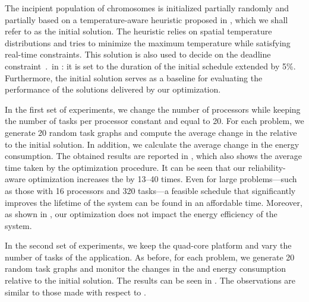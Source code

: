 The incipient population of chromosomes is initialized partially randomly and
partially based on a temperature-aware heuristic proposed in \cite{xie2006},
which we shall refer to as the initial solution. The heuristic relies on spatial
temperature distributions and tries to minimize the maximum temperature while
satisfying real-time constraints. This solution is also used to decide on the
deadline constraint $\period$ in : it is set
to the duration of the initial schedule extended by 5\%. Furthermore, the
initial solution serves as a baseline for evaluating the performance of the
solutions delivered by our optimization.

In the first set of experiments, we change the number of processors \np while
keeping the number of tasks \nt per processor constant and equal to 20. For each
problem, we generate 20 random task graphs and compute the average change in the
 relative to the initial solution. In addition, we calculate the
average change in the energy consumption. The obtained results are reported in
, which also shows the average time taken by
the optimization procedure. It can be seen that our reliability-aware
optimization increases the  by 13--40 times. Even for large
problems---such as those with 16 processors and 320 tasks---a feasible schedule
that significantly improves the lifetime of the system can be found in an
affordable time. Moreover, as shown in , our
optimization does not impact the energy efficiency of the system.

In the second set of experiments, we keep the quad-core platform and vary the
number of tasks \nt of the application. As before, for each problem, we generate
20 random task graphs and monitor the changes in the  and energy
consumption relative to the initial solution. The results can be seen in
. The observations are similar to those made with
respect to .

